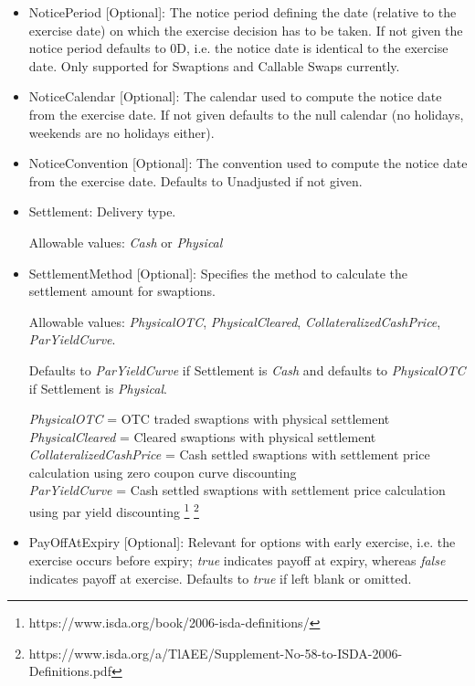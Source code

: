 \begin{itemize}
\item NoticePeriod [Optional]: The notice period defining the date (relative to the exercise date) on which the exercise
  decision has to be taken. If not given the notice period defaults to 0D, i.e. the notice date is identical to the
  exercise date. Only supported for Swaptions and Callable Swaps currently.

\item NoticeCalendar [Optional]: The calendar used to compute the notice date from the exercise date. If not given
  defaults to the null calendar (no holidays, weekends are no holidays either).

\item NoticeConvention [Optional]: The convention used to compute the notice date from the exercise date. Defaults to
  Unadjusted if not given.

\item Settlement: Delivery type. 

  Allowable values: \emph{Cash} or \emph{Physical}

\item SettlementMethod [Optional]: Specifies the method to calculate the settlement amount for swaptions.

  Allowable values: \emph{PhysicalOTC}, \emph{PhysicalCleared}, \emph{CollateralizedCashPrice},\\ \emph{ParYieldCurve}. 
  
  Defaults to \emph{ParYieldCurve} if Settlement is \emph{Cash} and defaults to \emph{PhysicalOTC} if Settlement is \emph{Physical}.

\emph{PhysicalOTC} = OTC traded swaptions with physical settlement\\
\emph{PhysicalCleared} = Cleared swaptions with physical settlement\\
\emph{CollateralizedCashPrice} = Cash settled swaptions with settlement price calculation using zero coupon curve discounting \\
\emph{ParYieldCurve}  = Cash settled swaptions with settlement price calculation using par yield discounting \footnote{https://www.isda.org/book/2006-isda-definitions/} \footnote{https://www.isda.org/a/TlAEE/Supplement-No-58-to-ISDA-2006-Definitions.pdf} \\

\item PayOffAtExpiry [Optional]: Relevant for options with early
  exercise, i.e. the exercise occurs before expiry; \emph{true}
  indicates payoff at expiry, whereas \emph{false}  indicates payoff
  at exercise. Defaults to \emph{true}  if left blank or omitted. 


\end{itemize}
